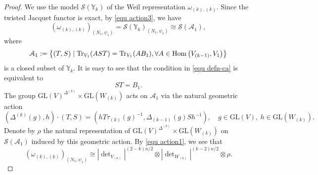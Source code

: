 \documentclass[11pt,reqno]{amsart}
\renewcommand{\1}{{\mathbf{1}}} \newcommand{\sB}{{\mathscr{B}}}
\newcommand{\BY}{{\mathbb {Y}}} \newcommand{\BZ}{{\mathbb {Z}}}
\newcommand{\CA}{{\mathcal {A}}} \newcommand{\CB}{{\mathcal {B}}}
\newcommand{\CS}{{\mathcal {S}}} \newcommand{\CT}{{\mathcal {T}}}
\newcommand{\GL}{{\mathrm{GL}}}\newcommand{\G}{{\mathrm{G}}}
\newcommand{\Tr}{{\mathrm{Tr}}}
\theoremstyle{plain}
\theoremstyle{definition}
\numberwithin{equation}{section}
\begin{document}
\begin{proof} We use the model $\CS(\BY_k)$ of the Weil representation $\omega_{(k),(k)}$. Since the twisted Jacquet functor is exact, by \eqref{equ action3}, we have
$$\left(\omega_{(k),(k)}\right)_{\left(N_{1},\psi_1\right)}=\CS(\BY_k)_{\left(N_{1},\psi_1\right)}\cong\CS(\CA_1),$$ where 
\begin{equation}\label{equ defn-ca}\CA_1:=\left\{(T,S)\mid \Tr_{V_1}(AST)=\Tr_{V_1}(AB_1), \forall A\in\Hom\left(V_{(k-1)},V_1\right) \right\}\end{equation} is a closed subset of $\BY_k$. It is easy to see that the condition in \eqref{equ defn-ca} is equivalent to 
\begin{equation}\label{equ st}ST=B_1.\end{equation} 
The group $\GL(V)^{\Delta^{(k)}}\times\GL(W_{(k)})$ acts on $\CA_1$ via the natural geometric action
$$(\Delta^{(k)}(g),h)\cdot(T,S)=(hT\tau_{(k)}(g)^{-1},\Delta_{(k-1)}(g)Sh^{-1}),\quad g\in\GL(V),\ h\in\GL(W_{(k)}).$$  Denote by $\rho$ the natural representation of $\GL(V)^{\Delta^{(k)}}\times\GL(W_{(k)})$ on $\CS(\CA_1)$ induced by this geometric action. By \eqref{equ action1}, we see that \begin{equation}\label{equ isom-pf1}\left(\omega_{(k),(k)}\right)_{\left(N_{1},\psi_1\right)}\cong |\det\nolimits_{V_{(k)}}|^{(2-k)n/2}\otimes|\det\nolimits_{W_{(k)}}|^{(k-2)n/2}\otimes\rho.\end{equation}



\end{proof}
\end{document}
